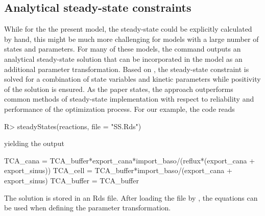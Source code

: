 \documentclass[article]{jss}
\begin{document}
\subsection{Analytical steady-state constraints}
While for the the present model, the steady-state could be explicitly calculated by hand, this might be much more challenging for models with a large number of states and parameters. For many of these models, the  command outputs an analytical steady-state solution that can be incorporated in the model as an additional parameter transformation. Based on \cite{rosenblatt2016customized}, the steady-state constraint is solved for a combination of state variables and kinetic parameters while positivity of the solution is ensured. As the paper states, the approach outperforms common methods of steady-state implementation with respect to reliability and performance of the optimization process. For our example, the code reads
\begin{CodeChunk}
\begin{CodeInput}
R> steadyStates(reactions, file = "SS.Rds")
\end{CodeInput}
\end{CodeChunk}
%
yielding the output
%
\begin{CodeChunk}
\begin{CodeOutput}
TCA_cana   = TCA_buffer*export_cana*import_baso/(reflux*(export_cana + 
	   export_sinus))
TCA_cell   = TCA_buffer*import_baso/(export_cana + export_sinus)
TCA_buffer = TCA_buffer
\end{CodeOutput}
\end{CodeChunk}
%
The solution is stored in an Rds file. After loading the file by , the equations can be used when defining the parameter transformation.



{}
\end{document}
